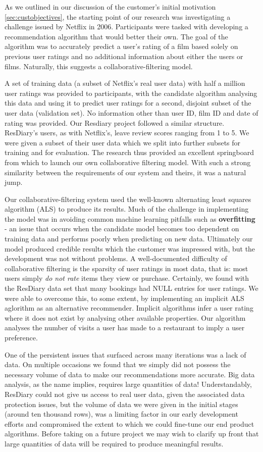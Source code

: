 \documentclass{l3proj}
\begin{document}
As we outlined in our discussion of the customer’s initial motivation \ref{sec:custobjectives}, the starting point of our research was investigating a challenge issued by Netflix in 2006. Participants were tasked with developing a recommendation algorithm that would better their own. The goal of the algorithm was to accurately predict a user's rating of a film based solely on previous user ratings and no additional information about either the users or films. Naturally, this suggests a collaborative-filtering model.

A set of training data (a subset of Netflix's real user data) with half a million user ratings was provided to participants, with the candidate algorithm analysing this data and using it to predict user ratings for a second, disjoint subset of the user data (validation set). No information other than user ID, film ID and date of rating was provided. Our Resdiary project followed a similar structure. ResDiary's users, as with Netflix's, leave review scores ranging from 1 to 5. We were given a subset of their user data which we split into further subsets for training and for evaluation. The research thus provided an excellent springboard from which to launch our own collaborative filtering model. With such a strong similarity between the requirements of our system and theirs, it was a natural jump.

Our collaborative-filtering system used the well-known alternating least squares algorithm (ALS) to produce its results. Much of the challenge in implementing the model was in avoiding common machine learning pitfalls such as \textbf{overfitting} - an issue that occurs when the candidate model becomes too dependent on training data and performs poorly when predicting on new data. Ultimately our model produced credible results which the customer was impressed with, but the development was not without problems. A well-documented difficulty of collaborative filtering is the sparsity of user ratings in most data, that is: most users simply \textit{do not rate} items they view or purchase. Certainly, we found with the ResDiary data set that many bookings had NULL entries for user ratings. We were able to overcome this, to some extent, by implementing an implicit ALS aglorithm as an alternative recommender. Implicit algorithms infer a user rating where it does not exist by analysing other available properties. Our algorithm analyses the number of visits a user has made to a restaurant to imply a user preference.

One of the persistent issues that surfaced across many iterations was a lack of data. On multiple occasions we found that we simply did not possess the necessary volume of data to make our recommendations more accurate. Big data analysis, as the name implies, requires large quantities of data! Understandably, ResDiary could not give us access to real user data, given the associated data protection issues, but the volume of data we were given in the initial stages (around ten thousand rows), was a limiting factor in our early development efforts and compromised the extent to which we could fine-tune our end product algorithms. Before taking on a future project we may wish to clarify up front that large quantities of data will be required to produce meaningful results.
\end{document}
